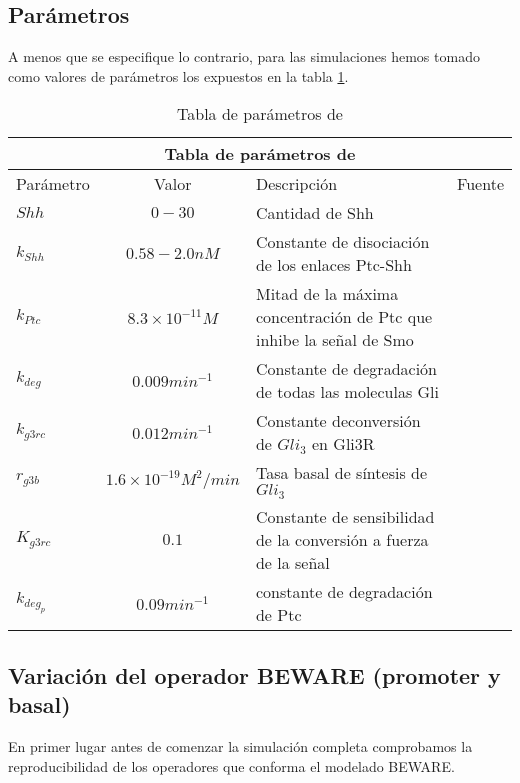 \subsection{Parámetros}
A menos que se especifique lo contrario, para las simulaciones hemos tomado como valores de parámetros los expuestos en la tabla \ref{tabla11}.
\begin{table}[h]
	\begin{center}
		
		\begin{tabular}{ |p{3cm}||c|p{3cm}|p{3cm}|  }
			\hline
			\multicolumn{4}{|c|}{Tabla de parámetros de \cite{schaffer}  } \\
			\hline
			Parámetro & Valor & Descripción & Fuente\\
			\hline
			$Shh $  & $0-30$    &\tiny{Cantidad de Shh} &   \cite{schaffer}\\
			$k_{Shh}$ &  $ 0.58-2.0nM$  & \tiny{Constante de disociación de los enlaces Ptc-Shh}   & \cite{taipale2002patched}\\
			$k_{Ptc} $ & $8.3\times10^{-11}M$ & \tiny{ Mitad de la máxima concentración de Ptc que inhibe la señal de Smo } &  \cite{taipale2002patched}\\
			$k_{deg}$   &$0.009min^{-1} $ & \tiny{ Constante de degradación de todas las moleculas Gli } &  \cite{chen1999nuclear}\\
			
			$k_{g3rc}$ &  $0.012min^{-1}$  & \tiny{ Constante deconversión de $Gli_3$ en Gli3R} & \cite{schaffer}\\
			$r_{g3b}$ & $1.6\times10^{-19}M^2/min$  & \tiny{ Tasa basal de síntesis de $Gli_3$ }   & \cite{schaffer}\\
			$K_{g3rc}$ & $0.1$ & \tiny{ Constante de sensibilidad de la conversión a fuerza de la señal }   & \cite{schaffer}\\
			
			$k_{deg_p}$& $0.09min^{-1} $ &  \tiny{constante de degradación de Ptc} & \cite{french1996intracellular}\\
			
			\hline
		\end{tabular}
		
	\end{center}
	\caption{Tabla de parámetros de \cite{schaffer} }\label{param_2}
	\label{tabla11}
\end{table}

\subsection{Variación del operador BEWARE (promoter y basal)}
En primer lugar antes de comenzar la simulación completa comprobamos la reproducibilidad de los operadores que conforma el modelado BEWARE. 

